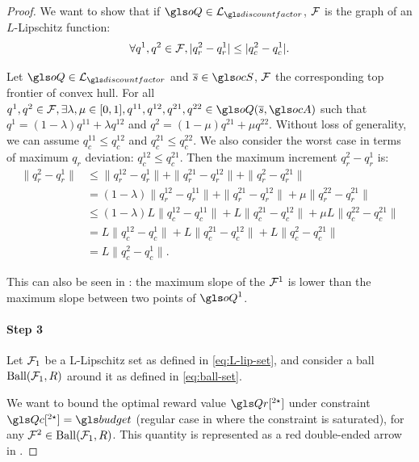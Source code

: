 \begin{subappendices}
\begin{proof}
    We want to show that if $\oQ\in\cL_{\discountfactor}$, $\mathcal{F}$ is the graph of an $L$-Lipschitz function:
    \begin{equation}
        \label{eq:L-lip-set}
        \forall q^1,q^2\in\mathcal{F}, |q_r^2-q_r^1| \leq |q_c^2-q_c^1|.
    \end{equation}

    Let $\oQ\in\cL_{\discountfactor}$ and $\os\in\ocS$, $\mathcal{F}$ the corresponding top frontier of convex hull.
    For all $q^1,q^2\in\cF, \exists \lambda,\mu\in[0,1], q^{11},q^{12},q^{21},q^{22}\in \oQ(\os,\ocA)$ such that $q^1 = (1-\lambda)q^{11} + \lambda q^{12}$ and $q^2 = (1-\mu)q^{21} + \mu q^{22}$.
    Without loss of generality, we can assume $q_c^{11}\leq q_c^{12}$ and $q_c^{21}\leq q_c^{22}$. We also consider the worst case in terms of maximum $q_r$ deviation: $q_c^{12} \leq q_c^{21}$.
    Then the maximum increment $q_r^2-q_r^{1}$ is:
    \begin{align*}
        \|q^2_r-q^{1}_r\| &\leq \|q^{12}_r-q^{1}_r\| + \|q^{21}_r-q^{12}_r\| + \|q^{2}_r-q^{21}_r\| \\
        &= (1-\lambda)\|q^{12}_r-q^{11}_r\| + \|q^{21}_r-q^{12}_r\| + \mu\|q^{22}_r-q^{21}_r\| \\
        &\leq (1-\lambda)L\|q^{12}_c-q^{11}_c\| + L\|q^{21}_c-q^{12}_c\| + \mu L\|q^{22}_c-q^{21}_c\| \\
        &= L\|q^{12}_c-q^{1}_c\| + L\|q^{21}_c-q^{12}_c\| + L\|q^{2}_c-q^{21}_c\|\\
        &= L\|q^{2}_c-q^{1}_c\|.
    \end{align*}

    This can also be seen in : the maximum slope of the $\mathcal{F}^1$ is lower than the maximum slope between two points of $\oQ^1$.

    \paragraph{Step 3}

    Let $\mathcal{F}_1$ be a L-Lipschitz set as defined in \eqref{eq:L-lip-set}, and consider a ball $\text{Ball}(\mathcal{F}_1,R)$ around it as defined in \eqref{eq:ball-set}.

    We want to bound the optimal reward value $\Qr[^{2\star}]$ under constraint $\Qc[^{2\star}] = \budget$ (regular case in  where the constraint is saturated), for any $\mathcal{F}^2\in\text{Ball}(\mathcal{F}_1,R)$. This quantity is represented as a red double-ended arrow in .


\end{proof}
\end{subappendices}
